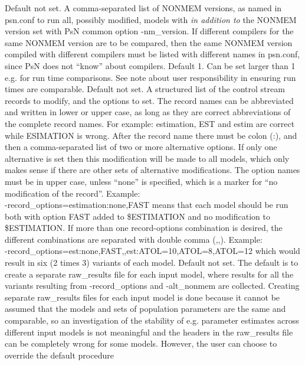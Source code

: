 \begin{optionlist}
Default not set. 
A comma-separated list of NONMEM versions, as named in psn.conf to run all, possibly modified, models with
\emph{in addition to} the NONMEM version set with PsN common option -nm\_version.
If different compilers for the same NONMEM version are to be compared, 
then the same NONMEM version compiled with different compilers
must be listed with different names in psn.conf, since PsN does not ``know'' about compilers.
\nextopt
{}
Default 1. Can be set larger than 1 e.g. for run time comparisons.
See note about user responsibility in ensuring run times are comparable.
\nextopt
{}
Default not set.
A structured list of the control stream records to modify, and the options to set. 
The record names can be abbreviated and written in lower or upper case,
as long as they are correct abbreviations of the complete record names. 
For example: estimation, EST and estim are correct while ESIMATION
is wrong. After the record name there must be colon (:), and then
a comma-separated list of two or more alternative options.
If only one alternative is set then this modification will be made to all models, which only makes
sense if there are other sets of alternative modifications.
The option names must be in upper case, unless ``none'' is specified, which is 
a marker for ``no modification of the record''. Example: \\
-record\_options=estimation:none,FAST means that
each model should be run both with option FAST added to \$ESTIMATION and no modification to \$ESTIMATION.
If more than one record-options combination is desired, the different combinations are 
separated with double comma (,,). Example: \\
-record\_options=est:none,FAST,,est:ATOL=10,ATOL=8,ATOL=12 
which would result in six (2 times 3) variants of each model.
\nextopt
{}
Default not set. The default is to create a separate raw\_results file for each input model,
where results for all the variants resulting from -record\_options and -alt\_nonmem
are collected. Creating separate raw\_results files for each input model is done because
it cannot be assumed that the models and sets of population parameters are the same and comparable,
so an investigation of the stability of e.g. parameter estimates across different input models
is not meaningful and the headers in the raw\_results file can be completely wrong for some models. 
However, the user can choose to override the default procedure

\end{optionlist}
